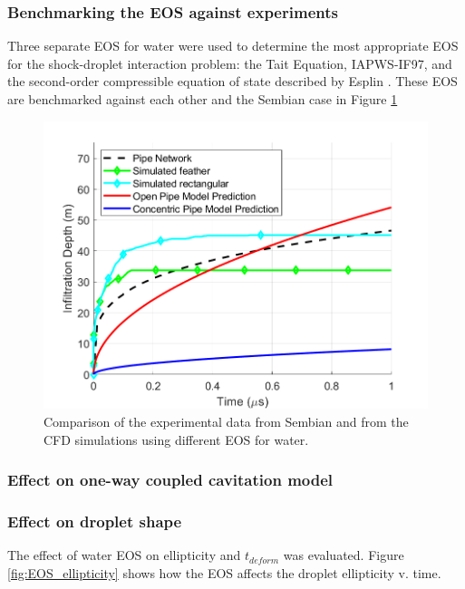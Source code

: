 \documentclass{UCF_ETD}
\begin{document}
\subsubsection{Benchmarking the EOS against experiments}

Three separate EOS for water were used to determine the most appropriate EOS for the shock-droplet interaction problem: the Tait Equation, IAPWS-IF97, and the second-order compressible equation of state described by Esplin \cite{Esplin2016}.
These EOS are benchmarked against each other and the Sembian case \cite{Sembian} in Figure \ref{fig:sembian_benchmark}

\begin{figure}
\centering
\includegraphics[width=\textwidth]{Figures/sembian_benchmark.png}
\caption{Comparison of the experimental data from Sembian \cite{Sembian} and from the CFD simulations using different EOS for water.}
\label{fig:sembian_benchmark}
\end{figure}

\subsubsection{Effect on one-way coupled cavitation model}

\subsubsection{Effect on droplet shape}

The effect of water EOS on ellipticity and $t_{deform}$ was evaluated.
Figure \ref{fig:EOS_ellipticity} shows how the EOS affects the droplet ellipticity v. time.
\end{document}
